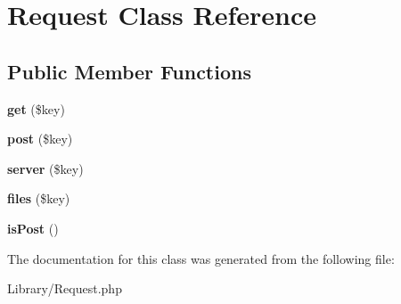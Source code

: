 \hypertarget{class_request}{\section{Request Class Reference}
\label{class_request}
}
\subsection*{Public Member Functions}
\begin{DoxyCompactItemize}
\item 
\hypertarget{class_request_a24a9bf83a1002d46ece83a93d14bd921}{{\bfseries get} (\$key)}\label{class_request_a24a9bf83a1002d46ece83a93d14bd921}

\item 
\hypertarget{class_request_a00ba439ffbc7a78df5f313ad780503d2}{{\bfseries post} (\$key)}\label{class_request_a00ba439ffbc7a78df5f313ad780503d2}

\item 
\hypertarget{class_request_a53b35eef049be6f323fd8066b37d6be6}{{\bfseries server} (\$key)}\label{class_request_a53b35eef049be6f323fd8066b37d6be6}

\item 
\hypertarget{class_request_a938a7fa5c2633579704b0f4a3ded2d01}{{\bfseries files} (\$key)}\label{class_request_a938a7fa5c2633579704b0f4a3ded2d01}

\item 
\hypertarget{class_request_a2d62038e063e771c2fd920155f344d58}{{\bfseries is\-Post} ()}\label{class_request_a2d62038e063e771c2fd920155f344d58}

\end{DoxyCompactItemize}


The documentation for this class was generated from the following file\-:\begin{DoxyCompactItemize}
\item 
Library/Request.\-php\end{DoxyCompactItemize}
